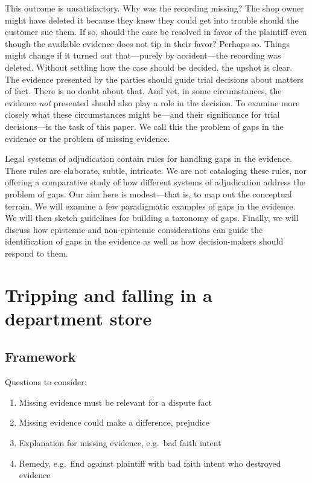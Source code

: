 \documentclass[
  10pt,
  dvipsnames,enabledeprecatedfontcommands]{scrartcl}
\begin{document}
This outcome is unsatisfactory. Why was the recording missing? The shop
owner might have deleted it because they knew they could get into
trouble should the customer sue them. If so, should the case be resolved
in favor of the plaintiff even though the available evidence does not
tip in their favor? Perhaps so. Things might change if it turned out
that---purely by accident---the recording was deleted. Without settling
how the case should be decided, the upshot is clear. The evidence
presented by the parties should guide trial decisions about matters of
fact. There is no doubt about that. And yet, in some circumstances, the
evidence \textit{not} presented should also play a role in the decision.
To examine more closely what these circumstances might be---and their
significance for trial decisions---is the task of this paper. We call
this the problem of gaps in the evidence or the problem of missing
evidence.

Legal systems of adjudication contain rules for handling gaps in the
evidence. These rules are elaborate, subtle, intricate. We are not
cataloging these rules, nor offering a comparative study of how
different systems of adjudication address the problem of gaps. Our aim
here is modest---that is, to map out the conceptual terrain. We will
examine a few paradigmatic examples of gaps in the evidence. We will
then sketch guidelines for building a taxonomy of gaps. Finally, we will
discuss how epistemic and non-epistemic considerations can guide the
identification of gaps in the evidence as well as how decision-makers
should respond to them.

\hypertarget{tripping-and-falling-in-a-department-store}{%
\section{Tripping and falling in a department
store}\label{tripping-and-falling-in-a-department-store}}

\hypertarget{framework}{%
\subsection{Framework}\label{framework}}

Questions to consider:

\begin{enumerate}
\def\labelenumi{(\arabic{enumi})}
\item
  Missing evidence must be relevant for a dispute fact
\item
  Missing evidence could make a difference, prejudice
\item
  Explanation for missing evidence, e.g.~bad faith intent
\item
  Remedy, e.g.~find against plaintiff with bad faith intent who
  destroyed evidence
\end{enumerate}
\end{document}
